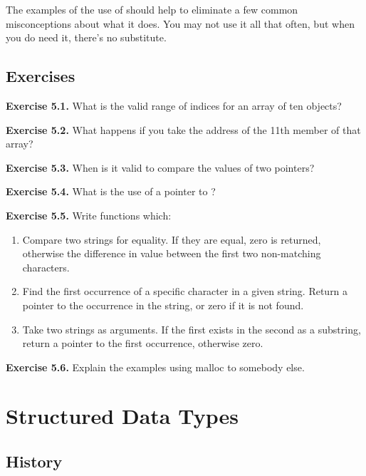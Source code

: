   The examples of the use of \sizeof{} should help to eliminate
   a few common misconceptions about what it does. You may not use it all
   that often, but when you do need it, there's no substitute.


 
        \section{Exercises}
        

  \textbf{Exercise 5.1.} What is the valid range of indices for an array of ten
   objects?


  \textbf{Exercise 5.2.} What happens if you take the address of the 11th member
   of that array?


  \textbf{Exercise 5.3.} When is it valid to compare the values of two
   pointers?


  \textbf{Exercise 5.4.} What is the use of a pointer to
   \void{}?


  \textbf{Exercise 5.5.} Write functions which:

\begin{enumerate}
    \item Compare two strings for equality. If they are equal, zero is returned,
     otherwise the difference in value between the first two non-matching
     characters.

    \item Find the first occurrence of a specific character in a given string.
     Return a pointer to the occurrence in the string, or zero if it is not
     found.

    \item Take two strings as arguments. If the first exists in the second as a
     substring, return a pointer to the first occurrence, otherwise zero.
   \end{enumerate}

  \textbf{Exercise 5.6.} Explain the examples using malloc to somebody
   else.


 \chapter{Structured Data Types}\label{chap:structTypes}


        \section{History}
        

